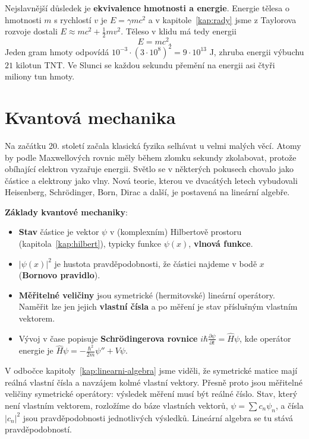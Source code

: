 Nejslavnější důsledek je \textbf{ekvivalence hmotnosti a energie}. Energie tělesa o hmotnosti $m$ s rychlostí $v$ je $E = \gamma mc^2$ a v kapitole~\ref{kap:rady} jsme z Taylorova rozvoje dostali $E\approx mc^2 + \frac{1}{2}mv^2$. Těleso v klidu má tedy energii
\begin{equation*}
  E = mc^2.
\end{equation*}
Jeden gram hmoty odpovídá $10^{-3}\cdot{\left(3\cdot 10^8\right)}^2 = 9\cdot 10^{13}$ J, zhruba energii výbuchu $21$ kilotun TNT. Ve Slunci se každou sekundu přemění na energii asi čtyři miliony tun hmoty.

\section{Kvantová mechanika}

Na začátku 20. století začala klasická fyzika selhávat u velmi malých věcí. Atomy by podle Maxwellových rovnic měly během zlomku sekundy zkolabovat, protože obíhající elektron vyzařuje energii. Světlo se v některých pokusech chovalo jako částice a elektrony jako vlny. Nová teorie, kterou ve dvacátých letech vybudovali Heisenberg, Schrödinger, Born, Dirac a další, je postavená na lineární algebře.

\begin{definitionbox}
  \textbf{Základy kvantové mechaniky}:
  \begin{itemize}
    \item \textbf{Stav} částice je vektor $\psi$ v (komplexním) Hilbertově prostoru (kapitola~\ref{kap:hilbert}), typicky funkce $\psi(x)$, \textbf{vlnová funkce}.
    \item $|\psi(x)|^2$ je hustota pravděpodobnosti, že částici najdeme v bodě $x$ (\textbf{Bornovo pravidlo}).
    \item \textbf{Měřitelné veličiny} jsou symetrické (hermitovské) lineární operátory. Naměřit lze jen jejich \textbf{vlastní čísla} a po měření je stav příslušným vlastním vektorem.
    \item Vývoj v čase popisuje \textbf{Schrödingerova rovnice} $i\hbar\frac{\partial\psi}{\partial t} = \hat{H}\psi$, kde operátor energie je $\hat{H}\psi = -\frac{\hbar^2}{2m}\psi'' + V\psi$.
  \end{itemize}
\end{definitionbox}

V odbočce kapitoly~\ref{kap:linearni-algebra} jsme viděli, že symetrické matice mají reálná vlastní čísla a navzájem kolmé vlastní vektory. Přesně proto jsou měřitelné veličiny symetrické operátory: výsledek měření musí být reálné číslo. Stav, který není vlastním vektorem, rozložíme do báze vlastních vektorů, $\psi = \sum c_n\psi_n$, a čísla $|c_n|^2$ jsou pravděpodobnosti jednotlivých výsledků. Lineární algebra se tu stává pravděpodobností.

